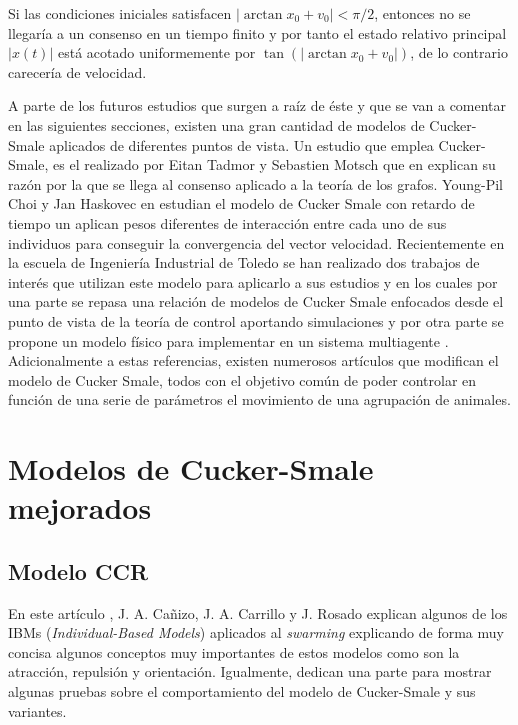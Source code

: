 Si las condiciones iniciales satisfacen $|\arctan x_0 + v_0| < \pi/2$, entonces no se llegaría a un consenso en un tiempo finito y por tanto el estado relativo principal $|x(t)|$ está acotado uniformemente por $\tan(|\arctan x_0 +v_0|)$, de lo contrario carecería de velocidad.

A parte de los futuros estudios que surgen a raíz de éste y que se van a comentar en las siguientes secciones, existen una gran cantidad de modelos de Cucker-Smale aplicados de diferentes puntos de vista. Un estudio que emplea Cucker-Smale, es el realizado por Eitan Tadmor y Sebastien Motsch que en \cite{motsch2014heterophilious} explican su razón por la que se llega al consenso aplicado a la teoría de los grafos. Young-Pil Choi y Jan Haskovec en \cite{choi2016cucker} estudian el modelo de Cucker Smale con retardo de tiempo un aplican pesos diferentes de interacción entre cada uno de sus individuos para conseguir la convergencia del vector velocidad. Recientemente en la escuela de Ingeniería Industrial de Toledo se han realizado dos trabajos de interés que utilizan este modelo para aplicarlo a sus estudios y en los cuales por una parte se repasa una relación de modelos de Cucker Smale enfocados desde el punto de vista de la teoría de control aportando simulaciones \cite{jb2019tfg, ggl2019tfg} y por otra parte se propone un modelo físico para implementar en un sistema multiagente \cite{rc2019tfg, jg2020tfg}. Adicionalmente a estas referencias, existen numerosos artículos \cite{carrillo2010particle, albi2013binary, ha2008particle} que modifican el modelo de Cucker Smale, todos con el objetivo común de poder controlar en función de una serie de parámetros el movimiento de una agrupación de animales. 




\section{Modelos de Cucker-Smale mejorados}\label{s3_3}

\subsection{Modelo CCR} \label{s3_3_1}
En este artículo \cite{canizo2010collective},  J. A. Cañizo, J. A. Carrillo y J. Rosado explican algunos de los IBMs (\textit{Individual-Based Models}) aplicados al \textit{swarming} explicando de forma muy concisa algunos conceptos muy importantes de estos modelos como son la atracción, repulsión y orientación. Igualmente, dedican una parte para mostrar algunas pruebas sobre el comportamiento del modelo de Cucker-Smale y sus variantes. 


